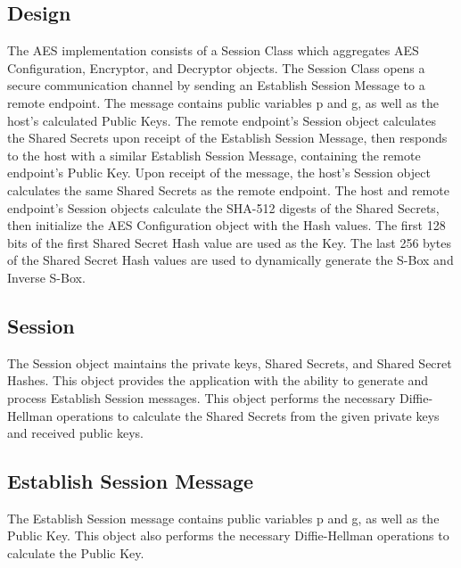 \documentclass[journal]{IEEEtran}
\begin{document}
\subsection{Design}
The AES implementation consists of a Session Class which aggregates AES Configuration, Encryptor, and Decryptor objects. The Session Class opens a secure communication channel by sending an Establish Session Message to a remote endpoint. The message contains public variables p and g, as well as the host’s calculated Public Keys.  The remote endpoint’s Session object calculates the Shared Secrets upon receipt of the Establish Session Message, then responds to the host with a similar Establish Session Message, containing the remote endpoint’s Public Key. Upon receipt of the message, the host’s Session object calculates the same Shared Secrets as the remote endpoint. The host and remote endpoint’s Session objects calculate the SHA-512 digests of the Shared Secrets, then initialize the AES Configuration object with the Hash values. The first 128 bits of the first Shared Secret Hash value are used as the Key. The last 256 bytes of the Shared Secret Hash values are used to dynamically generate the S-Box and Inverse S-Box.

\subsection{Session}
The Session object maintains the private keys, Shared Secrets, and Shared Secret Hashes. This object provides the application with the ability to generate and process Establish Session messages. This object performs the necessary Diffie-Hellman operations to calculate the Shared Secrets from the given private keys and received public keys. 

\subsection{Establish Session Message}
The Establish Session message contains public variables p and g, as well as the Public Key. This object also performs the necessary Diffie-Hellman operations to calculate the Public Key.
\end{document}
